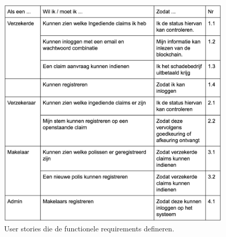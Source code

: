 \begin{figure}[h!]
    \begin{center}
        \includegraphics[scale=0.7]{images/userstories}
        \caption{User stories die de functionele requirements defineren.}
        \label{fig:userstories}
    \end{center}
\end{figure}
\newpage

